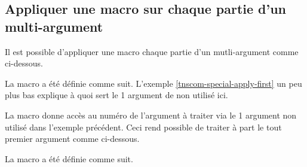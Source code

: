 \documentclass[12pt,a4paper]{article}
\begin{document}

\subsection{Appliquer une macro sur chaque partie d'un \og multi-argument \fg}


Il est possible d'appliquer une macro chaque partie d'un mutli-argument comme ci-dessous.

\makeatletter
\newcommand\decoone[2]{ ((#2)) }

\newcommand\multiapply[1]{%
    \tns@multi@apply@each{\decoone}{#1}
}
\makeatother

\begin{latexex}
\multiapply{1 | 2 | 3}
\end{latexex}

La macro  a été définie comme suit.
L'exemple \ref{tnscom-special-apply-first} un peu plus bas explique à quoi sert le 1\ier{} argument de  non utilisé ici.

\begin{latexex-alone}
\newcommand\decoone[2]{ ((#2)) }

\newcommand\multiapply[1]{%
    \tns@multi@apply@each{\decoone}{#1}
}
\end{latexex-alone}




 \label{tnscom-special-apply-first}

La macro  donne accès au numéro de l'argument à traiter via le 1\ier{} argument non utilisé dans l'exemple précédent.
Ceci rend possible de traiter à part le tout premier argument comme ci-dessous.

\makeatletter
\newcommand\decofirstandothers[2]{%
    \ifnum#1=1
        \fbox{#2} %
    \else%
        <<#2>> %
    \fi%
}

\newcommand\multiapplyafterone[1]{%
    \tns@multi@apply@each{\decofirstandothers}{#1} 
}
\makeatother

\begin{latexex}
\multiapplyafterone{1 | 2 | 3}
\end{latexex}

La macro  a été définie comme suit.
\end{document}
